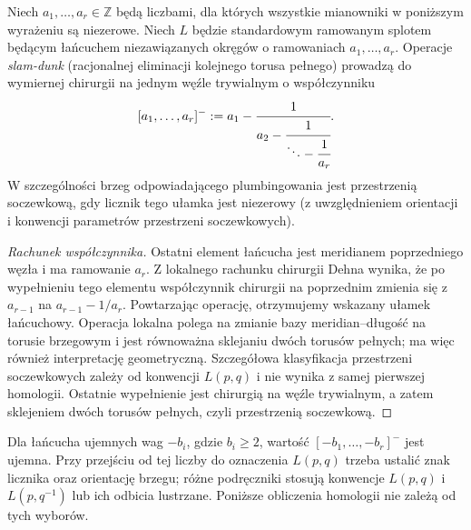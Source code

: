 \begin{stwierdzenie}
Niech $a_1,\dots,a_r\in\mathbb Z$ będą liczbami,
dla których wszystkie mianowniki w poniższym wyrażeniu
są niezerowe. Niech $L$ będzie standardowym ramowanym
splotem będącym łańcuchem niezawiązanych okręgów o
ramowaniach $a_1,\dots,a_r$. Operacje \emph{slam-dunk}
(racjonalnej eliminacji kolejnego torusa pełnego)
prowadzą do wymiernej chirurgii na jednym węźle trywialnym
o współczynniku
\[
[a_1,\dots,a_r]^-:=a_1-\cfrac1{a_2-
\cfrac1{\ddots-\cfrac1{a_r}}}.
\]
W szczególności brzeg odpowiadającego plumbingowania
jest przestrzenią soczewkową, gdy licznik tego ułamka
jest niezerowy (z uwzględnieniem orientacji i konwencji
parametrów przestrzeni soczewkowych).
\end{stwierdzenie}

\begin{proof}[Rachunek współczynnika]
Ostatni element łańcucha jest meridianem poprzedniego
węzła i ma ramowanie $a_r$. Z lokalnego rachunku chirurgii
Dehna wynika, że po wypełnieniu tego elementu
współczynnik chirurgii na poprzednim zmienia się z
$a_{r-1}$ na $a_{r-1}-1/a_r$. Powtarzając operację,
otrzymujemy wskazany ułamek łańcuchowy. Operacja lokalna
polega na zmianie bazy meridian--długość na torusie
brzegowym i jest równoważna sklejaniu dwóch torusów
pełnych; ma więc również interpretację geometryczną.
Szczegółowa klasyfikacja przestrzeni soczewkowych
zależy od konwencji $L(p,q)$ i nie wynika z samej
pierwszej homologii. Ostatnie wypełnienie jest chirurgią
na węźle trywialnym, a zatem sklejeniem dwóch torusów
pełnych, czyli przestrzenią soczewkową.
\end{proof}

\begin{uwaga}
Dla łańcucha ujemnych wag $-b_i$, gdzie $b_i\ge2$,
wartość $[-b_1,\dots,-b_r]^-$ jest ujemna.
Przy przejściu od tej liczby do oznaczenia $L(p,q)$
trzeba ustalić znak licznika oraz orientację brzegu;
różne podręczniki stosują konwencje $L(p,q)$ i
$L(p,q^{-1})$ lub ich odbicia lustrzane.
Poniższe obliczenia homologii nie zależą od tych wyborów.
\end{uwaga}

